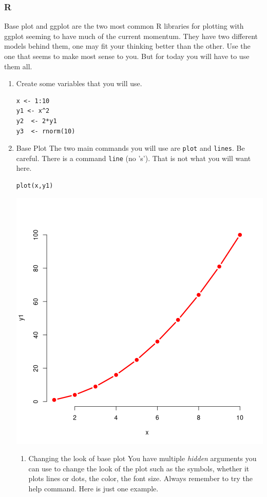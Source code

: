 \documentclass{article}
\begin{document}
\subsubsection{R}
\label{sec:org3d37670}
Base plot and ggplot are the two most common R libraries for plotting with ggplot seeming to have much of the current momentum. They have two different models behind them, one may fit your thinking better than the other. Use the one that seems to make most sense to you. But for today you will have to use them all.
\begin{enumerate}
\item Create some variables that you will use.
\label{sec:org82671fb}
\begin{verbatim}
x <- 1:10
y1 <- x^2
y2  <- 2*y1
y3  <- rnorm(10)
\end{verbatim}
\item Base Plot
\label{sec:org15d0a94}
The two main commands you will use are \texttt{plot} and \texttt{lines}. Be careful. There is a command \texttt{line} (no 's'). That is not what you will want here.
\begin{verbatim}
plot(x,y1)
\end{verbatim}

\begin{center}
\includegraphics[width=.9\linewidth]{baseplot1.png}
\end{center}
\begin{enumerate}
\item Changing the look of base plot
\label{sec:org67362a7}
You have multiple \emph{hidden} arguments you can use to change the look of the plot such as the symbols, whether it plots lines or dots, the color, the font size. Always remember to try the help command. Here is just one example.


\end{enumerate}
\end{enumerate}
\end{document}
